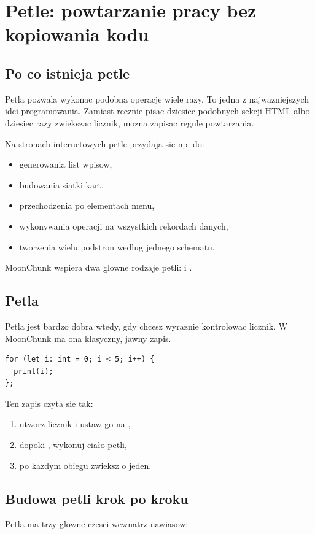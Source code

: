 \chapter{Petle: powtarzanie pracy bez kopiowania kodu}

\section{Po co istnieja petle}
Petla pozwala wykonac podobna operacje wiele razy. To jedna z najwazniejszych idei
programowania. Zamiast recznie pisac dziesiec podobnych sekcji HTML albo dziesiec razy
zwiekszac licznik, mozna zapisac regule powtarzania.

Na stronach internetowych petle przydaja sie np. do:

\begin{itemize}
  \item generowania list wpisow,
  \item budowania siatki kart,
  \item przechodzenia po elementach menu,
  \item wykonywania operacji na wszystkich rekordach danych,
  \item tworzenia wielu podstron wedlug jednego schematu.
\end{itemize}

MoonChunk wspiera dwa glowne rodzaje petli:  i .

\section{Petla }
Petla  jest bardzo dobra wtedy, gdy chcesz wyraznie kontrolowac licznik.
W MoonChunk ma ona klasyczny, jawny zapis.

\begin{lstlisting}[style=moonchunk,caption={Klasyczna petla for}]
for (let i: int = 0; i < 5; i++) {
  print(i);
};
\end{lstlisting}

Ten zapis czyta sie tak:

\begin{enumerate}
  \item utworz licznik  i ustaw go na ,
  \item dopoki , wykonuj ciało petli,
  \item po kazdym obiegu zwieksz  o jeden.
\end{enumerate}

\section{Budowa petli  krok po kroku}
Petla  ma trzy glowne czesci wewnatrz nawiasow:

